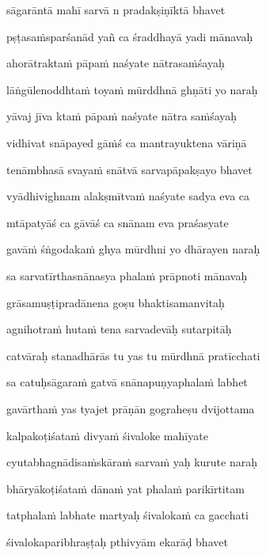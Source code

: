 sāgarāntā mahī sarvā n pradakṣiṇīktā bhavet \veg\dontdisplaylinenum

pṣṭasa\.msparśanād yañ ca śraddhayā yadi mānavaḥ\thinspace{\dandab} \dontdisplaylinenum

ahorātrakta\.m pāpa\.m naśyate nātrasa\.mśayaḥ \veg\dontdisplaylinenum

lāṅgūlenoddhta\.m toya\.m mūrddhnā ghṇāti yo naraḥ\thinspace{\dandab} \dontdisplaylinenum

yāvaj jīva kta\.m pāpa\.m naśyate nātra sa\.mśayaḥ \veg\dontdisplaylinenum

vidhivat snāpayed gā\.mś ca mantrayuktena vāriṇā\thinspace{\dandab} \dontdisplaylinenum

tenāmbhasā svaya\.m snātvā sarvapāpakṣayo bhavet \veg\dontdisplaylinenum

vyādhivighnam alakṣmītva\.m naśyate sadya eva ca\thinspace{\dandab} \dontdisplaylinenum

mtāpatyāś ca gāvāś ca snānam eva praśasyate \veg\dontdisplaylinenum

gavā\.m śṅgodaka\.m ghya mūrdhni yo dhārayen naraḥ\thinspace{\dandab} \dontdisplaylinenum

sa sarvatīrthasnānasya phala\.m prāpnoti mānavaḥ \veg\dontdisplaylinenum

grāsamuṣṭipradānena goṣu bhaktisamanvitaḥ\thinspace{\dandab} \dontdisplaylinenum

agnihotra\.m huta\.m tena sarvadevāḥ sutarpitāḥ \veg\dontdisplaylinenum

catvāraḥ stanadhārās tu yas tu mūrdhnā pratīcchati\thinspace{\dandab} \dontdisplaylinenum

sa catuḥsāgara\.m gatvā snānapuṇyaphala\.m labhet \veg\dontdisplaylinenum

gavārtha\.m yas tyajet prāṇān gograheṣu dvijottama\thinspace{\dandab} \dontdisplaylinenum

kalpakoṭiśata\.m divya\.m śivaloke mahīyate \veg\dontdisplaylinenum

cyutabhagnādisa\.mskāra\.m sarva\.m yaḥ kurute naraḥ\thinspace{\dandab} \dontdisplaylinenum

bhāryākoṭiśata\.m dāna\.m yat phala\.m parikīrtitam \veg\dontdisplaylinenum 

tatphala\.m labhate martyaḥ śivaloka\.m ca gacchati\thinspace{\dandab} \dontdisplaylinenum

śivalokaparibhraṣṭaḥ pthivyām ekarāḍ bhavet \veg\dontdisplaylinenum

